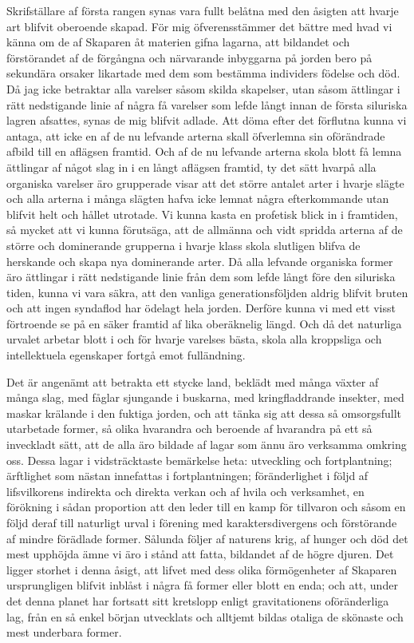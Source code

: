 Skrifställare af första rangen synas vara fullt belåtna med den åsigten att hvarje art blifvit oberoende skapad. För mig öfverensstämmer det bättre med hvad vi känna om de af Skaparen åt materien gifna lagarna, att bildandet och förstörandet af de förgångna och närvarande inbyggarna på jorden bero på sekundära orsaker likartade med dem som bestämma individers födelse och död. Då jag icke betraktar alla varelser såsom skilda skapelser, utan såsom ättlingar i rätt nedstigande linie af några få varelser som lefde långt innan de första siluriska lagren afsattes, synas de mig blifvit adlade. Att döma efter det förflutna kunna vi antaga, att icke en af de nu lefvande arterna skall öfverlemna sin oförändrade afbild till en aflägsen framtid. Och af de nu lefvande arterna skola blott få lemna ättlingar af något slag in i en långt aflägsen framtid, ty det sätt hvarpå alla organiska varelser äro grupperade visar att det större antalet arter i hvarje slägte och alla arterna i många slägten hafva icke lemnat några efterkommande utan blifvit helt och hållet utrotade. Vi kunna kasta en profetisk blick in i framtiden, så mycket att vi kunna förutsäga, att de allmänna och vidt spridda arterna af de större och dominerande grupperna i hvarje klass skola slutligen blifva de herskande och skapa nya dominerande arter. Då alla lefvande organiska former äro ättlingar i rätt nedstigande linie från dem som lefde långt före den siluriska tiden, kunna vi vara säkra, att den vanliga generationsföljden aldrig blifvit bruten och att ingen syndaflod har ödelagt hela jorden. Derföre kunna vi med ett visst förtroende se på en säker framtid af lika oberäknelig längd. Och då det naturliga urvalet arbetar blott i och för hvarje varelses bästa, skola alla kroppsliga och intellektuela egenskaper fortgå emot fulländning.

Det är angenämt att betrakta ett stycke land, beklädt med många växter af många slag, med fåglar sjungande i buskarna, med kringfladdrande insekter, med maskar krälande i den fuktiga jorden, och att tänka sig att dessa så omsorgsfullt utarbetade former, så olika hvarandra och beroende af hvarandra på ett så inveckladt sätt, att de alla äro bildade af lagar som ännu äro verksamma omkring oss. Dessa lagar i vidsträcktaste bemärkelse heta: utveckling och fortplantning; ärftlighet som nästan innefattas i fortplantningen; föränderlighet i följd af lifsvilkorens indirekta och direkta verkan och af hvila och verksamhet, en förökning i sådan proportion att den leder till en kamp för tillvaron och såsom en följd deraf till naturligt urval i förening med karaktersdivergens och förstörande af mindre förädlade former. Sålunda följer af naturens krig, af hunger och död det mest upphöjda ämne vi äro i stånd att fatta, bildandet af de högre djuren. Det ligger storhet i denna åsigt, att lifvet med dess olika förmögenheter af Skaparen ursprungligen blifvit inblåst i några få former eller blott en enda; och att, under det denna planet har fortsatt sitt kretslopp enligt gravitationens oföränderliga lag, från en så enkel början utvecklats och alltjemt bildas otaliga de skönaste och mest underbara former.
